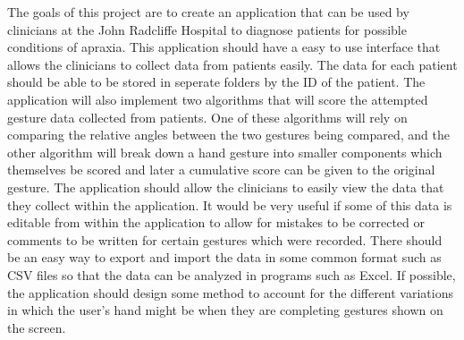 The goals of this project are to create an application that can be used by clinicians at the John Radcliffe Hospital to diagnose patients for possible conditions of apraxia. This application should have a easy to use interface that allows the clinicians to collect data from patients easily. The data for each patient should be able to be stored in seperate folders by the ID of the patient. The application will also implement two algorithms that will score the attempted gesture data collected from patients. One of these algorithms will rely on comparing the relative angles between the two gestures being compared, and the other algorithm will break down a hand gesture into smaller components which themselves be scored and later a cumulative score can be given to the original gesture. The application should allow the clinicians to easily view the data that they collect within the application. It would be very useful if some of this data is editable from within the application to allow for mistakes to be corrected or comments to be written for certain gestures which were recorded. There should be an easy way to export and import the data in some common format such as CSV files so that the data can be analyzed in programs such as Excel. If possible, the application should design some method to account for the different variations in which the user's hand might be when they are completing gestures shown on the screen. 

